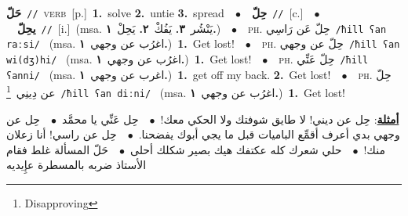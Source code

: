 \documentclass[10pt,a4paper,twoside]{article} %
\begin{document}
\begin{multicols}{2}
{\setlength\topsep{0pt}\textbf{\foreignlanguage{arabic}{حَلّ}}\ {\color{gray}\texttt{//}\color{black}}\ \textsc{verb}\ [p.]\ \textbf{1.}~solve  \textbf{2.}~untie  \textbf{3.}~spread\ \ $\bullet$\ \ \setlength\topsep{0pt}\textbf{\foreignlanguage{arabic}{حِلّ}}\ {\color{gray}\texttt{//}\color{black}}\ [c.]\ \ $\bullet$\ \ \setlength\topsep{0pt}\textbf{\foreignlanguage{arabic}{يحِلّ}}\ {\color{gray}\texttt{//}\color{black}}\ [i.]\ \color{gray}(msa. \foreignlanguage{arabic}{يَنْشُر}~\foreignlanguage{arabic}{\textbf{٣.}}  \foreignlanguage{arabic}{يَفُكْ}~\foreignlanguage{arabic}{\textbf{٢.}}  \foreignlanguage{arabic}{يَحِلْ}~\foreignlanguage{arabic}{\textbf{١.}})\color{black}\ \ $\bullet$\ \ \textsc{ph.} \color{gray} \foreignlanguage{arabic}{حِلّ عَن رَاسِي}\color{black}\ {\color{gray}\texttt{/{\sffamily ħill ʕan raːsi}/}\color{black}}\ \color{gray} (msa. \foreignlanguage{arabic}{اغرُب عن وجهي}~\foreignlanguage{arabic}{\textbf{١.}})\color{black}\ \textbf{1.}~Get lost!\ \ $\bullet$\ \ \textsc{ph.} \color{gray} \foreignlanguage{arabic}{حِلّ عن وجهي}\color{black}\ {\color{gray}\texttt{/{\sffamily ħill ʕan wi(dʒ)hi}/}\color{black}}\ \color{gray} (msa. \foreignlanguage{arabic}{اغرُب عن وجهي}~\foreignlanguage{arabic}{\textbf{١.}})\color{black}\ \textbf{1.}~Get lost!\ \ $\bullet$\ \ \textsc{ph.} \color{gray} \foreignlanguage{arabic}{حِلّ عَنِّي}\color{black}\ {\color{gray}\texttt{/{\sffamily ħill ʕanni}/}\color{black}}\ \color{gray} (msa. \foreignlanguage{arabic}{اغرب عن وجهي}~\foreignlanguage{arabic}{\textbf{١.}})\color{black}\ \textbf{1.}~get off my back.  \textbf{2.}~Get lost!\ \ $\bullet$\ \ \textsc{ph.} \color{gray} \foreignlanguage{arabic}{حِلّ عن دِينِي}\color{black}\ \footnote{Disapproving}\ {\color{gray}\texttt{/{\sffamily ħill ʕan diːni}/}\color{black}}\ \color{gray} (msa. \foreignlanguage{arabic}{اغرُب عن وجهي}~\foreignlanguage{arabic}{\textbf{١.}})\color{black}\ \textbf{1.}~Get lost!\  \begin{flushright}\color{gray}\foreignlanguage{arabic}{\textbf{\underline{\foreignlanguage{arabic}{أمثلة}}}: حِل عن ديني! لا طايق شوفتك ولا الحكي معك!\ $\bullet$\ \  حِل عَنِّي يا محمَّد\ $\bullet$\ \  حِل عن وجهي بدي أعرف أقمِّع الباميات قبل ما يجي أبوك يفضحنا.\ $\bullet$\ \  حِل عن راسي! أنا زعلان منك!\ $\bullet$\ \  حلي شعرك كله عكتفك هيك بصير شكلك أحلى\ $\bullet$\ \  حَلّ المسألة غلط فقام الأستاذ ضربه بالمسطرة عإِيديه}\end{flushright}\color{black}} \vspace{2mm}


\end{multicols}
\end{document}
